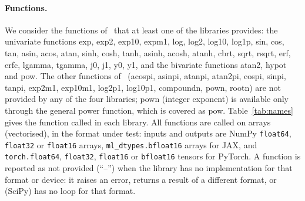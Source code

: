 \documentclass[11pt,a4paper]{article}
\begin{document}
\paragraph{Functions.} We consider the functions of~\cite{GIMOZ2026} that at least one of the libraries provides: the univariate functions exp, exp2, exp10, expm1, log, log2, log10, log1p, sin, cos, tan, asin, acos, atan, sinh, cosh, tanh, asinh, acosh, atanh, cbrt, sqrt, rsqrt, erf, erfc, lgamma, tgamma, j0, j1, y0, y1, and the bivariate functions atan2, hypot and pow. The other functions of~\cite{GIMOZ2026} (acospi, asinpi, atanpi, atan2pi, cospi, sinpi, tanpi, exp2m1, exp10m1, log2p1, log10p1, compoundn, pown, rootn) are not provided by any of the four libraries; pown (integer exponent) is available only through the general power function, which is covered as pow. Table~\ref{tab:names} gives the function called in each library. All functions are called on arrays (vectorised), in the format under test: inputs and outputs are NumPy \texttt{float64}, \texttt{float32} or \texttt{float16} arrays, \texttt{ml\_dtypes.bfloat16} arrays for JAX, and \texttt{torch.float64}, \texttt{float32}, \texttt{float16} or \texttt{bfloat16} tensors for PyTorch. A function is reported as not provided (``--'') when the library has no implementation for that format or device: it raises an error, returns a result of a different format, or (SciPy) has no loop for that format.
\end{document}
